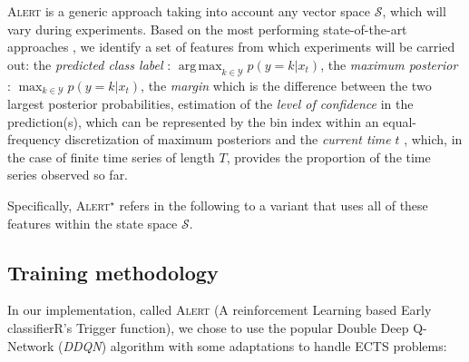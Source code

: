 \documentclass[sigconf, nonacm, table]{acmart}
\DeclareMathOperator*{\argmax}{arg\,max}
\begin{document}
\textsc{Alert} is a generic approach taking into account any vector space $\mathcal{S}$, which will vary during experiments. Based on the most performing state-of-the-art approaches \cite{renault2024early}, we identify a set of features from which experiments will be carried out: the \textit{predicted class label} \cite{schafer2020teaser}: $\argmax_{k \in \mathcal{Y}} p(y=k|x_t)$, the \textit{maximum posterior} \cite{mori2017early, bilski2023calimera}: $\max_{k \in \mathcal{Y}} p(y = k | x_t)$, the \textit{margin} \cite{mori2017early, schafer2020teaser, bilski2023calimera} which is the difference between the two largest posterior probabilities, estimation of the \textit{level of confidence} \cite{achenchabe2021early, zafar2021early} in the prediction(s), which can be represented by the bin index within an equal-frequency discretization of maximum posteriors and the \textit{current time} $t$ \cite{mori2017early}, which, in the case of finite time series of length $T$, provides the proportion of the time series observed so far. 

Specifically, \textsc{Alert$^{\star}$} refers in the following to a variant that uses all of these features within the state space $\mathcal{S}$. 




\subsection{Training methodology}

In our implementation, called \textsc{Alert} (A reinforcement Learning based Early classifierR's Trigger function), we chose to use the popular Double Deep Q-Network (\textit{DDQN}) algorithm \cite{mnih2015human, van2016deep} with some adaptations to handle ECTS problems: 
\end{document}
